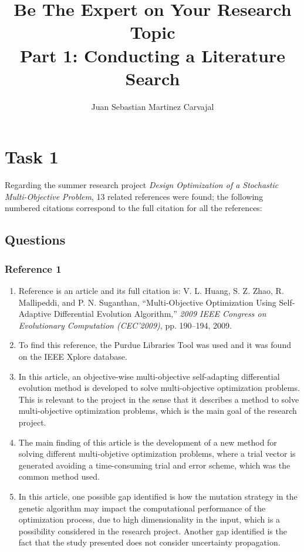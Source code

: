 \documentclass{journal}
\title{\textbf{Be The Expert on Your Research Topic}\\Part 1: Conducting a Literature Search}
\author{Juan Sebastian Martinez Carvajal}
\date{}
\begin{document}
\maketitle
\hrulefill

\section{Task 1}
Regarding the summer research project \textit{Design Optimization of a Stochastic Multi-Objective Problem}, 13 related references were found; the following numbered citations correspond to the full citation for all the references:\\




\subsection{Questions}

\subsubsection{Reference 1}
\begin{enumerate}
	\item Reference \cite{Huang2009} is an article and its full citation is: V. L. Huang, S. Z. Zhao, R. Mallipeddi, and P. N. Suganthan, “Multi-Objective Optimization Using Self-Adaptive Differential Evolution Algorithm,” \textit{2009 IEEE Congress on Evolutionary Computation (CEC’2009)}, pp. 190–194, 2009.
	\item To find this reference, the Purdue Libraries Tool was used and it was found on the IEEE Xplore database.
	\item In this article, an objective-wise multi-objective self-adapting differential evolution method is developed to solve multi-objective optimization problems. This is relevant to the project in the sense that it describes a method to solve multi-objective optimization problems, which is the main goal of the research project.
	\item The main finding of this article is the development of a new method for solving different multi-objetive optimization problems, where a trial vector is generated avoiding a time-consuming trial and error scheme, which was the common method used.
	\item In this article, one possible gap identified is how the mutation strategy in the genetic algorithm may impact the computational performance of the optimization process, due to high dimensionality in the input, which is a possibility considered in the research project. Another gap identified is the fact that the study presented does not consider uncertainty propagation.
\end{enumerate}
\end{document}
